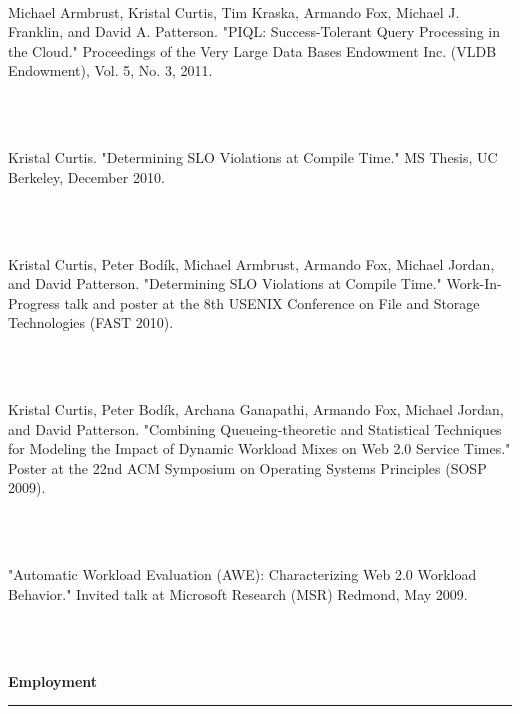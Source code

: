 \documentclass[11pt]{article}
\newcommand{\pagewidth}{6.5 in}
\newcommand{\tabwidth}{2.0 in}
\newcommand{\head}[1]{
{\bf #1} \\
\rule{\textwidth}{0.01 in}

\vspace{-0.35 in}

}
\begin{document}
\begin{tabbing}
\hspace{\tabwidth} \= \\ 

\parbox[t]{\pagewidth}{Michael Armbrust, Kristal Curtis, Tim Kraska, Armando Fox, Michael J. Franklin, and David A. Patterson.  "PIQL:  Success-Tolerant Query Processing in the Cloud."  Proceedings of the Very Large Data Bases Endowment Inc. (VLDB Endowment), Vol. 5, No. 3, 2011.}\\ \\
\parbox[t]{\pagewidth}{Kristal Curtis.  "Determining SLO Violations at Compile Time."  MS Thesis, UC Berkeley, December 2010.}\\ \\
\parbox[t]{\pagewidth}{Kristal Curtis, Peter Bod\'{i}k, Michael Armbrust, Armando Fox, Michael Jordan, and David Patterson.  "Determining SLO Violations at Compile Time."  Work-In-Progress talk and poster at the 8th USENIX Conference on File and Storage Technologies (FAST 2010).}\\ \\
\parbox[t]{\pagewidth}{Kristal Curtis, Peter Bod\'{i}k, Archana Ganapathi, Armando Fox, Michael Jordan, and David Patterson.  "Combining Queueing-theoretic and Statistical Techniques for Modeling the Impact of Dynamic Workload Mixes on Web 2.0 Service Times."  Poster at the 22nd ACM Symposium on Operating Systems Principles (SOSP 2009).}\\ \\
\parbox[t]{\pagewidth}{"Automatic Workload Evaluation (AWE):  Characterizing Web 2.0 Workload Behavior."  Invited talk at Microsoft Research (MSR) Redmond, May 2009.}\\ \\
\end{tabbing}

\pagebreak

\head{Employment}
\end{document}
